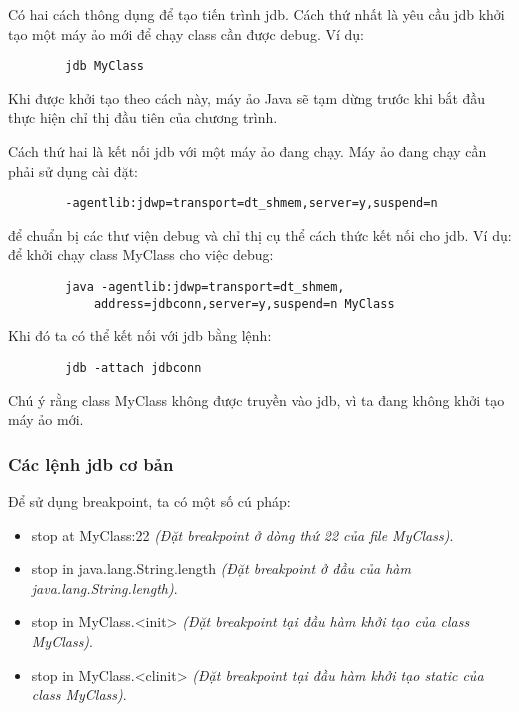 \documentclass{article}
\begin{document}
    Có hai cách thông dụng để tạo tiến trình jdb. Cách thứ nhất là yêu cầu jdb
    khởi tạo một máy ảo mới để chạy class cần được debug. Ví dụ:
    \begin{verbatim}
        jdb MyClass
    \end{verbatim}
    Khi được khởi tạo theo cách này, máy ảo Java sẽ tạm dừng trước khi bắt đầu
    thực hiện chỉ thị đầu tiên của chương trình.

    Cách thứ hai là kết nối jdb với một máy ảo đang chạy. Máy ảo đang chạy cần 
    phải sử dụng cài đặt:
    \begin{verbatim}
        -agentlib:jdwp=transport=dt_shmem,server=y,suspend=n
    \end{verbatim}
    để chuẩn bị các thư viện debug và chỉ thị cụ thể cách thức kết nối cho jdb. 
    Ví dụ: để khởi chạy class MyClass cho việc debug:
    \begin{verbatim}
        java -agentlib:jdwp=transport=dt_shmem,
            address=jdbconn,server=y,suspend=n MyClass
    \end{verbatim}
    Khi đó ta có thể kết nối với jdb bằng lệnh:
    \begin{verbatim}
        jdb -attach jdbconn 
    \end{verbatim}
    Chú ý rằng class MyClass không được truyền vào jdb, vì ta đang không khởi tạo máy
    ảo mới.

    \subsubsection{Các lệnh jdb cơ bản}
    Để sử dụng breakpoint, ta có một số cú pháp:
    \begin{itemize}
        \item {stop at MyClass:22 \textit{(Đặt breakpoint ở dòng thứ 22 của 
        file MyClass)}.}
        \item {stop in java.lang.String.length \textit{(Đặt breakpoint ở đầu của hàm\\
        java.lang.String.length)}.}
        \item {stop in MyClass.<init> \textit{(Đặt breakpoint tại đầu hàm khởi tạo của class MyClass)}.}
        \item {stop in MyClass.<clinit> \textit{(Đặt breakpoint tại đầu hàm khởi tạo static của class MyClass)}.}
    \end{itemize}
\end{document}
